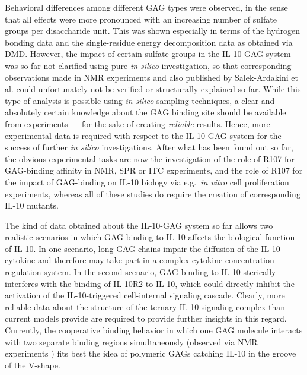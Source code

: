 Behavioral differences among different GAG types were observed, in the sense
that all effects were more pronounced with an increasing number of sulfate
groups per disaccharide unit. This was shown especially in terms of the hydrogen
bonding data and the single-residue energy decomposition data as obtained via
DMD. However, the impact of certain sulfate groups in the IL-10-GAG system was
so far not clarified using pure \textit{in silico} investigation, so that
corresponding observations made in NMR experiments and also published by
Salek-Ardakini et al. \cite{salek_ardakani_2000} could unfortunately not be
verified or structurally explained so far. While this type of analysis is
possible using \textit{in silico} sampling techniques, a clear and absolutely
certain knowledge about the GAG binding site should be available from
experiments --- for the sake of creating \textit{reliable} results. Hence, more
experimental data is required with respect to the IL-10-GAG system for the
success of further \textit{in silico} investigations. After what has been found
out so far, the obvious experimental tasks are now the investigation of the role
of R107 for GAG-binding affinity in NMR, SPR or ITC experiments, and the role of
R107 for the impact of GAG-binding on IL-10 biology via e.g.\ \textit{in vitro}
cell proliferation experiments, whereas all of these studies do require the
creation of corresponding IL-10 mutants.

The kind of data obtained about the IL-10-GAG system so far allows two realistic
scenarios in which GAG-binding to IL-10 affects the biological function of
IL-10. In one scenario, long GAG chains impair the diffusion of the IL-10
cytokine and therefore may take part in a complex cytokine concentration
regulation system. In the second scenario, GAG-binding to IL-10 sterically
interferes with the binding of IL-10R2 to IL-10, which could directly inhibit
the activation of the IL-10-triggered cell-internal signaling cascade. Clearly,
more reliable data about the structure of the ternary IL-10 signaling complex
than current models provide are required to provide further insights in this
regard. Currently, the cooperative binding behavior in which one GAG molecule
interacts with two separate binding regions simultaneously (observed via NMR
experiments \cite{kuenze_gehrcke_2014}) fits best the idea of polymeric GAGs
catching IL-10 in the groove of the V-shape.

